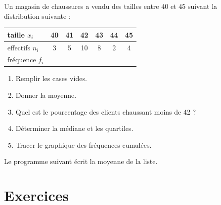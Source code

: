 \begin{example}

    Un magasin de chaussures a vendu des tailles entre \( 40\) et \( 45\) suivant la distribution suivante :
    \begin{center}
        \begin{tabular}{|l||c|c|c|c|c|c|}
            \hline
            taille \( x_i\)&40&41&42&43&44&45\\
            \hline
            effectifs \( n_i\)&3&5&10&8&2&4\\
            \hline
            fréquence \( f_i\)&&&&&&\\
            \hline
        \end{tabular}
    \end{center}
    \begin{enumerate}
        \item
            Remplir les cases vides.
        \item
            Donner la moyenne.
        \item
            Quel est le pourcentage des clients chaussant moins de 42 ?
        \item
            Déterminer la médiane et les quartiles.
        \item
            Tracer le graphique des fréquences cumulées.
    \end{enumerate}

    Le programme suivant écrit la moyenne de la liste.

    



\end{example}


\section{Exercices}



